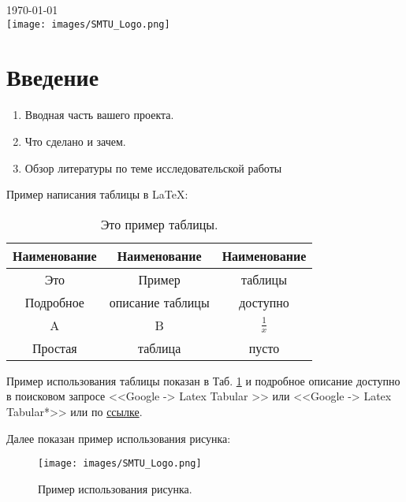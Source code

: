 \documentclass[11pt]{article}
\begin{document}
\begin{titlepage}

{\large \today}\\[0.5cm] %

\texttt{[image: images/SMTU\_Logo.png]}
 
\vfill %
\end{titlepage} %


\section{Введение}\label{sec:Introduction}
	\begin{enumerate}
		\item Вводная часть вашего проекта.
		\item Что сделано и зачем.
		\item Обзор литературы по теме исследовательской работы
	\end{enumerate}

Пример написания таблицы в \LaTeX:
\begin{table}[htb]
\centering
\caption{Это пример таблицы.}
\label{Tab:TabExample} %
\begin{tabular}{c|c|c} %
\textbf{Наименование} & \textbf{Наименование} & \textbf{Наименование} \\
\hline
Это	&	Пример	&	таблицы  \\
\hline
Подробное	&	описание таблицы	& доступно   \\
\hline
A	&	B	& $\frac{1}{x}$ \\
\hline
Простая	&	таблица	& пусто \\
\hline
\end{tabular}
\end{table}

Пример использования таблицы показан в Таб. \ref{Tab:TabExample} и подробное описание доступно в поисковом запросе <<Google -> Latex Tabular >> или <<Google -> Latex Tabular*>> или по \textcolor{blue}{\href{https://en.wikibooks.org/wiki/LaTeX/Tables}{ссылке}}.	
	
Далее показан пример использования рисунка:
\begin{figure}[htb]
\centering
\texttt{[image: images/SMTU\_Logo.png]}\\[1cm]  
\caption{Пример использования рисунка.}
\label{fig:FigExample}
\end{figure}	
	
\end{document}

